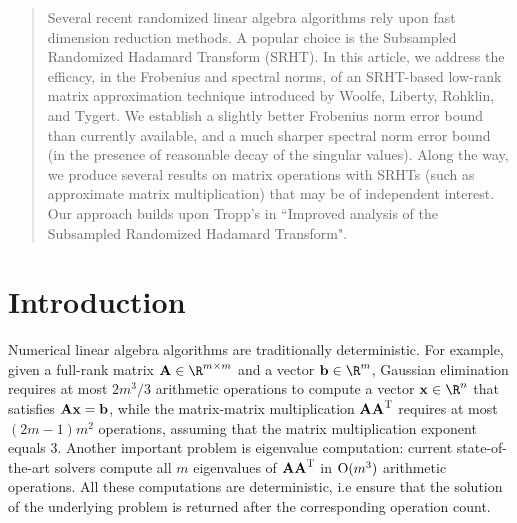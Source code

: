\begin{abstract}
Several recent randomized linear algebra algorithms rely upon fast dimension reduction methods.
A popular choice is the Subsampled Randomized Hadamard Transform (SRHT). In this article, we
address the efficacy, in the Frobenius and spectral norms, of an SRHT-based low-rank matrix
approximation technique introduced by Woolfe, Liberty, Rohklin, and Tygert. We establish a
slightly better Frobenius norm error bound than currently available, and a much sharper spectral
norm error bound (in the presence of reasonable decay of the singular values). Along the way, we
produce several results on matrix operations with SRHTs (such as approximate matrix multiplication)
that may be of independent interest. Our approach builds upon Tropp's in ``Improved analysis of the Subsampled Randomized Hadamard Transform".
\end{abstract}

\section{Introduction}
\label{sec:introduction}
Numerical linear algebra algorithms are traditionally deterministic.  For example, given a full-rank matrix $\matA \in \R^{m \times m}$
and a vector $\b \in \R^{m}$, Gaussian elimination requires at most $ 2 m^3 / 3$ arithmetic operations to compute a vector $\x \in \R^n$
that satisfies ${\bm{\mathrm{A}}} {\mathbf x} = {\mathbf b}$, while the matrix-matrix multiplication ${\bm{\mathrm{A}}} {\bm{\mathrm{A}}}^{\textsc{T}}$ requires at most $(2m-1)m^2$ operations,
assuming that the matrix multiplication exponent equals $3$.
Another important problem is eigenvalue computation: current state-of-the-art solvers compute
all $m$ eigenvalues of ${\bm{\mathrm{A}}} {\bm{\mathrm{A}}}^{\textsc{T}}$ in $\mathrm{O}(m^3)$ arithmetic operations.
All these computations are deterministic, i.e ensure that the solution of the underlying problem is returned after the corresponding operation count.

